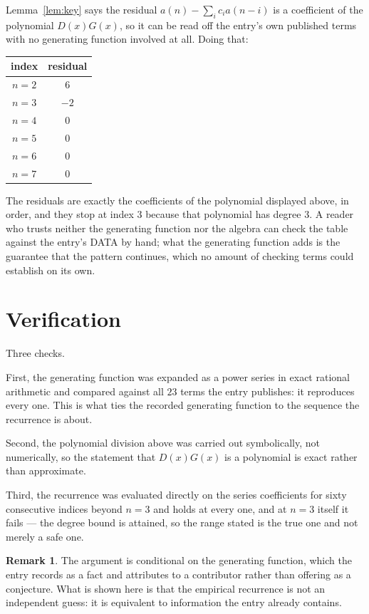 \documentclass[11pt,a4paper]{article}
\theoremstyle{plain}
\theoremstyle{definition}
\newtheorem{remark}[theorem]{Remark}
\begin{document}
Lemma~\ref{lem:key} says the residual $a(n)-\sum_ic_ia(n-i)$ is a coefficient of the
polynomial $D(x)G(x)$, so it can be read off the entry's own published terms with no
generating function involved at all. Doing that:
\begin{center}
\begin{tabular}{cc}
index & residual \\ \hline
$n=2$ & $6$ \\
$n=3$ & $-2$ \\
$n=4$ & $0$ \\
$n=5$ & $0$ \\
$n=6$ & $0$ \\
$n=7$ & $0$
\end{tabular}
\end{center}
The residuals are exactly the coefficients of the polynomial displayed above, in order, and
they stop at index $3$ because that polynomial has degree $3$. A reader who trusts
neither the generating function nor the algebra can check the table against the entry's DATA
by hand; what the generating function adds is the guarantee that the pattern continues, which
no amount of checking terms could establish on its own.

\section{Verification}

Three checks.

First, the generating function was expanded as a power series in exact rational arithmetic and
compared against all $23$ terms the entry publishes: it reproduces every one. This is
what ties the recorded generating function to the sequence the recurrence is about.

Second, the polynomial division above was carried out symbolically, not numerically, so the
statement that $D(x)G(x)$ is a polynomial is exact rather than approximate.

Third, the recurrence was evaluated directly on the series coefficients for sixty consecutive
indices beyond $n=3$ and holds at every one, and at $n=3$ itself it fails --- the
degree bound is attained, so the range stated is the true one and not merely a safe one.

\begin{remark}
The argument is conditional on the generating function, which the entry records as a fact and
attributes to a contributor rather than offering as a conjecture. What is shown here is that
the empirical recurrence is not an independent guess: it is equivalent to information the
entry already contains.
\end{remark}
\end{document}

